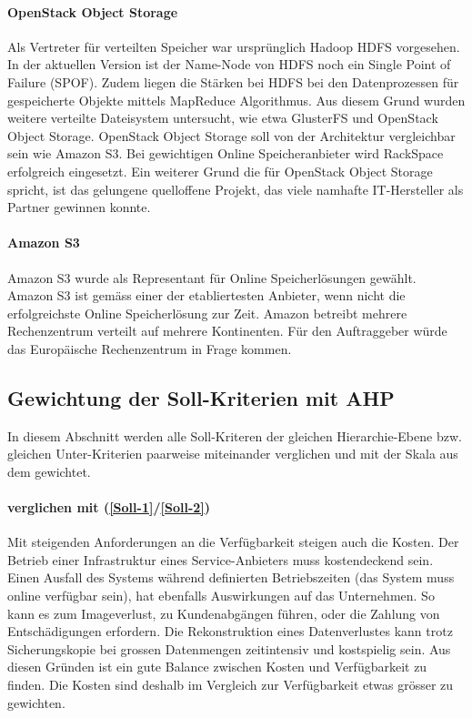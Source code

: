 \paragraph{OpenStack Object Storage}\label{Al-4}

Als Vertreter für verteilten Speicher war ursprünglich Hadoop HDFS vorgesehen. In der aktuellen Version ist der Name-Node von HDFS noch ein Single Point of Failure (SPOF). Zudem liegen die Stärken bei HDFS bei den Datenprozessen für gespeicherte Objekte mittels MapReduce Algorithmus. Aus diesem Grund wurden weitere verteilte Dateisystem untersucht, wie etwa GlusterFS und OpenStack Object Storage. OpenStack Object Storage soll von der Architektur vergleichbar sein wie Amazon S3. Bei gewichtigen Online Speicheranbieter wird RackSpace erfolgreich eingesetzt. Ein weiterer Grund die für OpenStack Object Storage spricht, ist das gelungene quelloffene Projekt, das viele namhafte IT-Hersteller als Partner gewinnen konnte.

\paragraph{Amazon S3}\label{Al-5}
Amazon S3 wurde als Representant für Online Speicherlösungen gewählt. Amazon S3 ist gemäss  einer der etabliertesten Anbieter, wenn nicht die erfolgreichste Online Speicherlösung zur Zeit. Amazon betreibt mehrere Rechenzentrum verteilt auf mehrere Kontinenten. Für den Auftraggeber würde das Europäische Rechenzentrum in Frage kommen.


\subsection{Gewichtung der Soll-Kriterien mit AHP}

In diesem Abschnitt werden alle Soll-Kriteren der gleichen Hierarchie-Ebene bzw. gleichen Unter-Kriterien paarweise miteinander verglichen und mit der Skala  aus dem  gewichtet.

\paragraph*{ verglichen mit  (\ref{Soll-1}/\ref{Soll-2})} 
Mit steigenden Anforderungen an die Verfügbarkeit steigen auch die Kosten. Der Betrieb einer Infrastruktur eines Service-Anbieters muss kostendeckend sein. Einen Ausfall des Systems während definierten Betriebszeiten (das System muss online verfügbar sein), hat ebenfalls Auswirkungen auf das Unternehmen. So kann es zum Imageverlust, zu Kundenabgängen führen, oder die Zahlung von Entschädigungen erfordern. Die Rekonstruktion eines Datenverlustes kann trotz Sicherungskopie bei grossen Datenmengen zeitintensiv und kostspielig sein. Aus diesen Gründen ist ein gute Balance zwischen Kosten und Verfügbarkeit zu finden. Die Kosten sind deshalb im Vergleich zur Verfügbarkeit etwas grösser zu gewichten.

